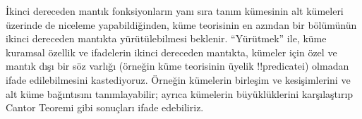 \documentclass[../../../include/open-logic-section]{subfiles}
\begin{document}


İkinci dereceden mantık fonksiyonların yanı sıra tanım kümesinin alt kümeleri
üzerinde de niceleme yapabildiğinden, küme teorisinin en azından bir
bölümünün ikinci dereceden mantıkta yürütülebilmesi beklenir. ``Yürütmek''
ile, küme kuramsal özellik ve ifadelerin ikinci dereceden mantıkta, kümeler
için özel ve mantık dışı bir söz varlığı (örneğin küme teorisinin üyelik
!!{predicate}{}i) olmadan ifade edilebilmesini kastediyoruz. Örneğin kümelerin
birleşim ve kesişimlerini ve alt küme bağıntısını tanımlayabilir; ayrıca
kümelerin büyüklüklerini karşılaştırıp Cantor Teoremi gibi sonuçları ifade
edebiliriz.
\end{document}
